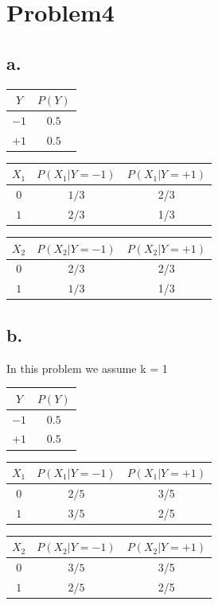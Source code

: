 \documentclass[a4paper,left=2.5cm,right=2.5cm,11pt]{article}
\begin{document}
\section*{Problem4}
\subsection*{a.}
\begin{tabular}{|c|c|}
	\hline
	$Y$ & $P(Y)$ \\
	\hline
	$-1$ & $0.5$\\
	\hline
	$+1$ & $0.5$\\
	\hline
\end{tabular}
\begin{tabular}{|c|c|c|}
	\hline
	$X_1$ & $P(X_1|Y=-1)$ &$P(X_1|Y=+1)$ \\
	\hline
	$0$ & $1/3$ & 2/3\\
	\hline
	$1$ & $2/3$ & 1/3\\
	\hline
\end{tabular}
\begin{tabular}{|c|c|c|}
	\hline
	$X_2$ & $P(X_2|Y=-1)$ &$P(X_2|Y=+1)$ \\
	\hline
	$0$ & $2/3$ & 2/3\\
	\hline
	$1$ & $1/3$ & 1/3\\
	\hline
\end{tabular}

\subsection*{b.}
In this problem we assume k = 1\\
\begin{tabular}{|c|c|}
	\hline
	$Y$ & $P(Y)$ \\
	\hline
	$-1$ & $0.5$\\
	\hline
	$+1$ & $0.5$\\
	\hline
\end{tabular}
\begin{tabular}{|c|c|c|}
	\hline
	$X_1$ & $P(X_1|Y=-1)$ &$P(X_1|Y=+1)$ \\
	\hline
	$0$ & $2/5$ & 3/5\\
	\hline
	$1$ & $3/5$ & 2/5\\
	\hline
\end{tabular}
\begin{tabular}{|c|c|c|}
	\hline
	$X_2$ & $P(X_2|Y=-1)$ &$P(X_2|Y=+1)$ \\
	\hline
	$0$ & $3/5$ & 3/5\\
	\hline
	$1$ & $2/5$ & 2/5\\
	\hline
\end{tabular}
\end{document}
